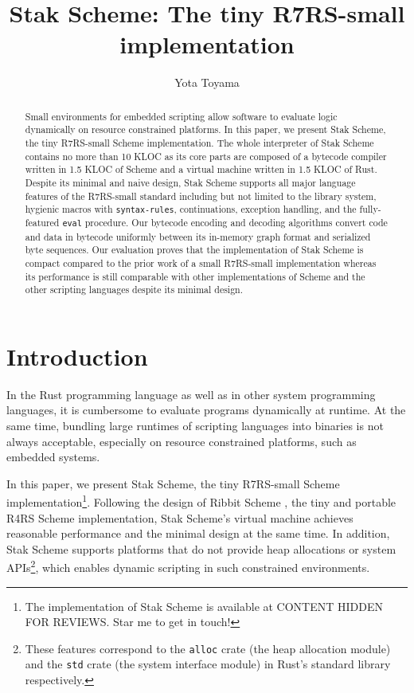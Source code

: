 \documentclass[sigplan, anonymous, review]{acmart}
\newcommand{\draft}[1]{CONTENT HIDDEN FOR REVIEWS}
\begin{document}
\title{Stak Scheme: The tiny R7RS-small implementation}
\author{Yota Toyama}

\begin{abstract}
  Small environments for embedded scripting allow software to
  evaluate logic dynamically on resource constrained platforms.
  In this paper, we present Stak Scheme, the tiny R7RS-small
  Scheme implementation.
  The whole interpreter of Stak Scheme contains no more than 10 KLOC as
  its core parts are composed of a bytecode compiler written in 1.5
  KLOC of Scheme
  and a virtual machine written in 1.5 KLOC of Rust.
  Despite its minimal and naive design, Stak Scheme
  supports all major language features of the R7RS-small standard including
  but not limited to the library system, hygienic macros with
  \texttt{syntax-rules}, continuations, exception handling, and the
  fully-featured \texttt{eval} procedure.
  Our bytecode encoding and decoding algorithms convert code and
  data in bytecode uniformly
  between its in-memory graph format and serialized byte sequences.
  Our evaluation proves that the implementation of Stak Scheme is
  compact compared to the prior work of a small R7RS-small implementation
  whereas its performance is still
  comparable with other implementations of Scheme and the other
  scripting languages despite its minimal design.
\end{abstract}

\maketitle

\section{Introduction}

In the Rust programming language as well as in other system
programming languages, it is cumbersome to evaluate programs
dynamically at runtime. At the same time, bundling large runtimes of
scripting languages into binaries is not always acceptable,
especially on resource constrained platforms, such as embedded systems.

In this paper, we present Stak Scheme, the tiny R7RS-small Scheme
implementation\footnote{
  The implementation of Stak Scheme is available at
  \draft{\url{https://github.com/raviqqe/stak}}. Star me to get in touch!
}.
Following the design of Ribbit Scheme
\cite{ribbit2023}, the tiny and
portable R4RS Scheme implementation, Stak Scheme's virtual machine
achieves reasonable performance and the minimal design
at the same time.
In addition, Stak Scheme supports platforms that do not provide
heap allocations or system APIs\footnote{
  These features correspond to the \texttt{alloc}
  crate (the heap allocation module) and the \texttt{std} crate (the
  system interface module) in Rust's standard library respectively.
}, which enables dynamic scripting in such constrained environments.
\end{document}
